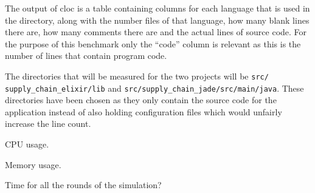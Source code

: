 The output of cloc is a table containing columns for each language that is used in the directory, along with the number files of that language, how many blank lines there are, how many comments there are and the actual lines of source code.
For the purpose of this benchmark only the ``code'' column is relevant as this is the number of lines that contain program code.

The directories that will be measured for the two projects will be \verb|src/|\\ \verb|supply_chain_elixir/lib| and \verb|src/supply_chain_jade/src/main/java|.
These directories have been chosen as they only contain the source code for the application instead of also holding configuration files which would unfairly increase the line count.

CPU usage.

Memory usage.

Time for all the rounds of the simulation?
